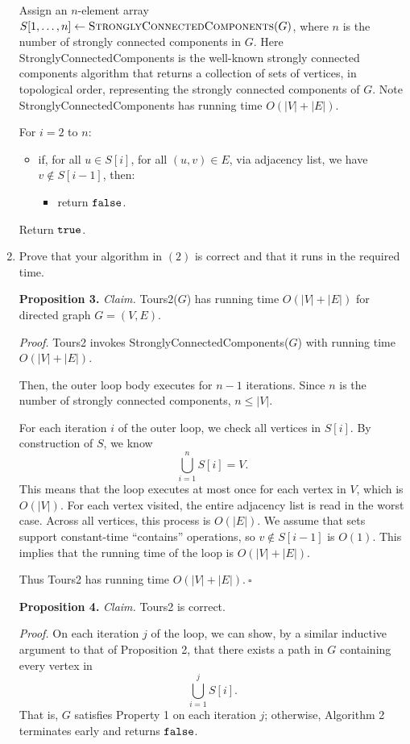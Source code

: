 \begin{enumerate}
\begin{solution}
Assign an $n$-element array $S[1,\dots,n]\leftarrow\textsc{StronglyConnectedComponents}(G)$, where $n$ is the number of strongly connected components in $G$. Here {\sc StronglyConnectedComponents} is the well-known strongly connected components algorithm that returns a collection of sets of vertices, in topological order, representing the strongly connected components of $G$. Note {\sc StronglyConnectedComponents} has running time $O(|V|+|E|)$.

For $i=2$ to $n$:
\begin{itemize}
    \item if, for all $u\in S[i]$, for all $(u,v)\in E$, via adjacency list, we have $v\notin S[i-1]$, then:
    \begin{itemize}
        \item return $\verb|false|$.
    \end{itemize}
\end{itemize}
Return $\verb|true|$.
\end{solution}
\item Prove that your algorithm in $(2)$ is correct and that it runs in the required time.
\begin{solution}

\textbf{Proposition 3. }\textit{Claim. }{\sc Tours2}($G$) has running time $O(|V|+|E|)$ for directed graph $G=(V,E)$.

\textit{Proof. }{\sc Tours2} invokes {\sc StronglyConnectedComponents}($G$) with running time $O(|V|+|E|)$.

Then, the outer loop body executes for $n-1$ iterations. Since $n$ is the number of strongly connected components, $n\leq|V|$.

For each iteration $i$ of the outer loop, we check all vertices in $S[i]$. By construction of $S$, we know \[\bigcup_{i=1}^{n}S[i]=V.\] This means that the loop executes at most once for each vertex in $V$, which is $O(|V|)$. For each vertex visited, the entire adjacency list is read in the worst case. Across all vertices, this process is $O(|E|)$. We assume that sets support constant-time  ``contains'' operations, so $v\notin S[i-1]$ is $O(1)$. This implies that the running time of the loop is $O(|V|+|E|)$.

Thus {\sc Tours2} has running time $O(|V|+|E|).~\square$

\textbf{Proposition 4. }\textit{Claim. }{\sc Tours2} is correct.

\textit{Proof. }On each iteration $j$ of the loop, we can show, by a similar inductive argument to that of Proposition 2, that there exists a path in $G$ containing every vertex in \[\bigcup_{i=1}^jS[i].\] That is, $G$ satisfies Property 1 on each iteration $j$; otherwise, Algorithm 2 terminates early and returns $\verb|false|$.


\end{solution}
\end{enumerate}
